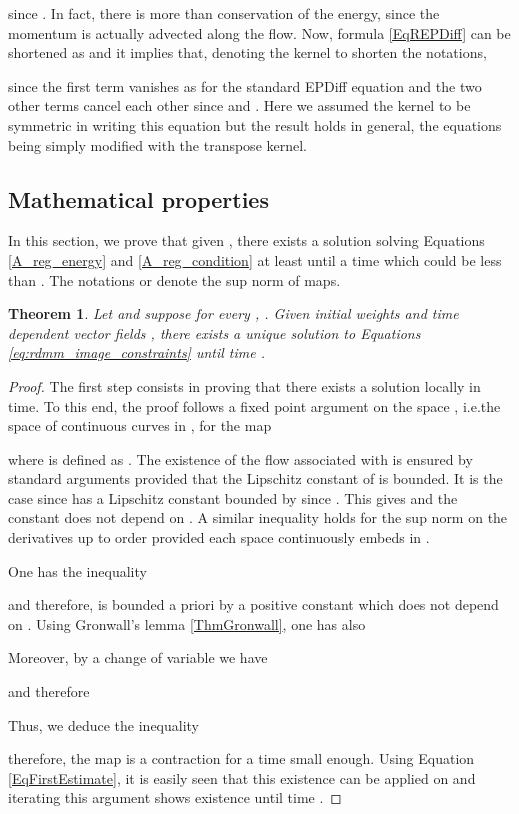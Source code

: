\documentclass{article}
\numberwithin{equation}{section}
\newtheorem{theorem}{Theorem}
\newcommand{\ie}{{i.e.}}
\begin{document}
since . In fact, there is more than conservation of the energy, since the momentum is actually advected along the flow. Now, formula \eqref{EqREPDiff} can be shortened as  and it implies that, denoting the kernel  to shorten the notations,

since the first term vanishes as for the standard EPDiff equation and the two other terms cancel each other since  and . Here we assumed the kernel to be symmetric in writing this equation but the result holds in general, the equations being simply modified with the transpose kernel.

\subsection{Mathematical properties}
\label{sec:mathematical_properties}

In this section, we prove that given , there exists a solution  solving Equations \eqref{A_reg_energy} and \eqref{A_reg_condition} at least until a time  which could be less than . The notations  or  denote the sup norm of  maps.

\begin{theorem}
Let  and suppose for every , .
Given initial weights  and time dependent vector fields , there exists a unique solution  to Equations \eqref{eq:rdmm_image_constraints} until time .
\end{theorem}

\begin{proof}
The first step consists in proving that there exists a solution locally in time. To this end, the proof follows a fixed point argument on the space , \ie  the space of continuous curves in , for the map

where  is defined as . 
The existence of the flow associated with  is ensured by standard arguments provided that the Lipschitz constant of  is bounded. It is the case since  has a Lipschitz constant bounded by  since . This gives  and the constant  does not depend on . A similar inequality holds for the sup norm on the  derivatives up to order  provided each space  continuously embeds in .
\par
One has the inequality

and therefore,  is bounded a priori by a positive constant which does not depend on .
Using Gronwall's lemma \eqref{ThmGronwall}, one has also

Moreover, by a change of variable  we have

and therefore

Thus, we deduce the inequality

therefore, the map  is a contraction for a time  small enough. 
Using Equation \eqref{EqFirstEstimate}, it is easily seen that this existence can be applied on  and iterating this argument shows existence until time .
\end{proof}
\end{document}
